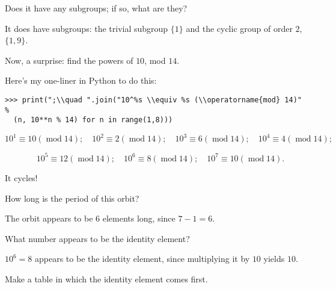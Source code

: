 \documentclass[../key.tex]{subfiles}
\begin{document}
\begin{inner_problem}
\item Does it have any subgroups; if so, what are they?
\end{inner_problem}

It does have subgroups: the trivial subgroup $\{1\}$ and the cyclic group of order $2$, $\{1,9\}$.

\begin{outer_problem}
\item Now, a surprise: find the powers of $10$, mod $14$.
\end{outer_problem}

Here's my one-liner in Python to do this:
\begin{verbatim}
>>> print(";\\quad ".join("10^%s \\equiv %s (\\operatorname{mod} 14)" %
  (n, 10**n % 14) for n in range(1,8)))
\end{verbatim}

$$10^1 \equiv 10 (\operatorname{mod} 14);\quad 10^2 \equiv 2 (\operatorname{mod} 14);\quad 10^3 \equiv 6 (\operatorname{mod} 14);\quad 10^4 \equiv 4 (\operatorname{mod} 14);$$

$$\quad 10^5\equiv 12 (\operatorname{mod} 14);\quad 10^6 \equiv 8 (\operatorname{mod} 14);\quad 10^7 \equiv 10 (\operatorname{mod} 14).$$

It cycles!

\begin{inner_problem}[start=1]
\item How long is the period of this orbit?
\end{inner_problem}

The orbit appears to be $6$ elements long, since $7-1=6$.

\begin{inner_problem}
\item What number appears to be the identity element?
\end{inner_problem}

$10^6=8$ appears to be the identity element, since multiplying it by $10$ yields $10$.

\begin{inner_problem}
\item Make a table in which the identity element comes first.
\end{inner_problem}
\end{document}
